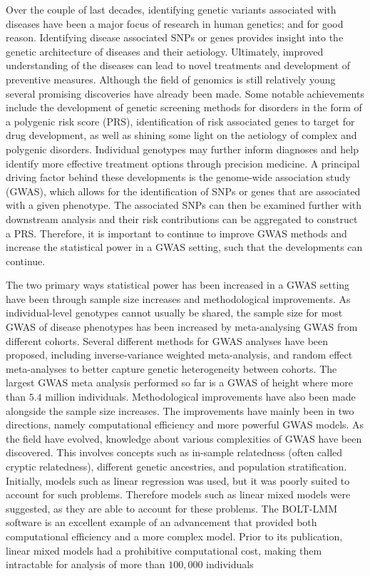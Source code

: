 
Over the couple of last decades, identifying genetic variants associated with diseases have been a major focus of research in human genetics; and for good reason. Identifying disease associated SNPs or genes provides insight into the genetic architecture of diseases and their aetiology. Ultimately, improved understanding of the diseases can lead to novel treatments and development of preventive measures. Although the field of genomics is still relatively young several promising discoveries have already been made. Some notable achievements include the development of genetic screening methods for disorders in the form of a polygenic risk score (PRS), identification of risk associated genes to target for drug development, as well as shining some light on the aetiology of complex and polygenic disorders. Individual genotypes may further inform diagnoses and help identify more effective treatment options through precision medicine. A principal driving factor behind these developments is the genome-wide association study (GWAS), which allows for the identification of SNPs or genes that are associated with a given phenotype. The associated SNPs can then be examined further with downstream analysis and their risk contributions can be aggregated to construct a PRS. Therefore, it is important to continue to improve GWAS methods and increase the statistical power in a GWAS setting, such that the developments can continue.

The two primary ways statistical power has been increased in a GWAS setting have been through sample size increases and methodological improvements. As individual-level genotypes cannot usually be shared, the sample size for most GWAS of disease phenotypes has been increased by meta-analysing GWAS from different cohorts. Several different methods for GWAS analyses have been proposed, including inverse-variance weighted meta-analysis\cite{willer2010metal}, and random effect meta-analyses to better capture genetic heterogeneity between cohorts\cite{han2011random}. The largest GWAS meta analysis performed so far is a GWAS of height where more than $ 5.4 $ million individuals\cite{yengo2022saturated}. Methodological improvements have also been made alongside the sample size increases. The improvements have mainly been in two directions, namely computational efficiency and more powerful GWAS models. As the field have evolved, knowledge about various complexities of GWAS have been discovered. This involves concepts such as in-sample relatedness (often called cryptic relatedness), different genetic ancestries, and population stratification. Initially, models such as linear regression was used, but it was poorly suited to account for such problems. Therefore models such as linear mixed models were suggested, as they are able to account for these problems. The BOLT-LMM\cite{loh2015efficient} software is an excellent example of an advancement that provided both computational efficiency and a more complex model. Prior to its publication, linear mixed models had a prohibitive computational cost, making them intractable for analysis of more than $ 100,000 $ individuals

